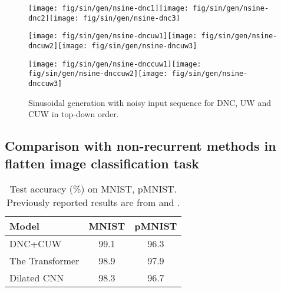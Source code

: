 \begin{figure}
\begin{centering}
\noindent\begin{minipage}[t]{1\columnwidth}\texttt{[image: fig/sin/gen/nsine-dnc1]}\texttt{[image: fig/sin/gen/nsine-dnc2]}\texttt{[image: fig/sin/gen/nsine-dnc3]}\end{minipage}
\par\end{centering}
\begin{centering}
\noindent\begin{minipage}[t]{1\columnwidth}\texttt{[image: fig/sin/gen/nsine-dncuw1]}\texttt{[image: fig/sin/gen/nsine-dncuw2]}\texttt{[image: fig/sin/gen/nsine-dncuw3]}\end{minipage}
\par\end{centering}
\begin{centering}
\noindent\begin{minipage}[t]{1\columnwidth}\texttt{[image: fig/sin/gen/nsine-dnccuw1]}\texttt{[image: fig/sin/gen/nsine-dnccuw2]}\texttt{[image: fig/sin/gen/nsine-dnccuw3]}\end{minipage}
\par\end{centering}
\caption{Sinusoidal generation with noisy input sequence for DNC, UW and CUW
in top-down order. \label{fig:Sinusoid-noisy}}
\end{figure}

\subsection{Comparison with non-recurrent methods in flatten image classification
task\label{subsec:Comparsion-with-non-recurrent}}

\begin{table}[H]
\begin{centering}
\begin{tabular}{|l|c|c|}
\hline 
Model & MNIST & pMNIST\tabularnewline
\hline 
\hline 
DNC+CUW & 99.1 & 96.3\tabularnewline
\hline 
The Transformer & 98.9 & 97.9\tabularnewline
\hline 
Dilated CNN & 98.3 & 96.7\tabularnewline
\hline 
\end{tabular}
\par\end{centering}
\caption{Test accuracy (\%) on MNIST, pMNIST. Previously reported results are
from \cite{vaswani2017attention} and \cite{chang2017dilated}.
\label{tab:mnist-1}}
\end{table}

